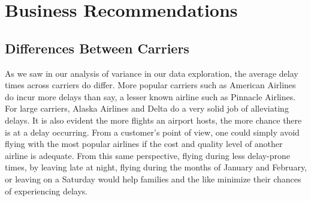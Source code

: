 \documentclass[12pt, a4paper, openany]{book}
\newcommand\tab[1][1cm]{\hspace*{#1}}
\begin{document}
\chapter{Business Recommendations}
	\section{Differences Between Carriers}
	\tab As we saw in our analysis of variance in our data exploration, the average delay times across carriers do differ. More popular carriers such as American Airlines do incur more delays than say, a lesser known airline such as Pinnacle Airlines. For large carriers, Alaska Airlines and Delta do a very solid job of alleviating delays. It is also evident the more flights an airport hosts, the more chance there is at a delay occurring. From a customer’s point of view, one could simply avoid flying with the most popular airlines if the cost and quality level of another airline is adequate. From this same perspective, flying during less delay-prone times, by leaving late at night, flying during the months of January and February, or leaving on a Saturday would help families and the like minimize their chances of experiencing delays. \\
\end{document}
